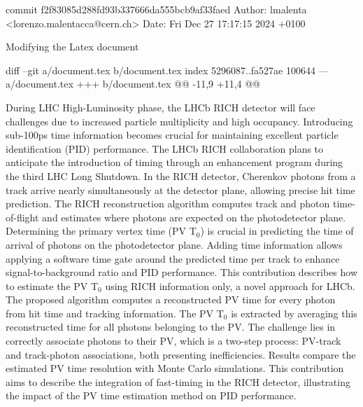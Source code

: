 commit f2f83085d288fd93b337666da555bcb9af33faed
Author: lmalenta <lorenzo.malentacca@cern.ch>
Date:   Fri Dec 27 17:17:15 2024 +0100

    Modifying the Latex document

diff --git a/document.tex b/document.tex
index 5296087..fa527ae 100644
--- a/document.tex
+++ b/document.tex
@@ -11,9 +11,4 @@
 
 During LHC High-Luminosity phase, the LHCb RICH detector will face challenges due to increased particle multiplicity and high occupancy. Introducing sub-100ps time information becomes crucial for maintaining excellent particle identification (PID) performance. The LHCb RICH collaboration plans to anticipate the introduction of timing through an enhancement program during the third LHC Long Shutdown. In the RICH detector, Cherenkov photons from a track arrive nearly simultaneously at the detector plane, allowing precise hit time prediction. The RICH reconstruction algorithm computes track and photon time-of-flight and estimates where photons are expected on the photodetector plane. Determining the primary vertex time (PV T$_0$) is crucial in predicting the time of arrival of photons on the photodetector plane. Adding time information allows applying a software time gate around the predicted time per track to enhance signal-to-background ratio and PID performance. This contribution describes how to estimate the PV T$_0$ using RICH information only, a novel approach for LHCb. The proposed algorithm computes a reconstructed PV time for every photon from hit time and tracking information. The PV T$_0$ is extracted by averaging this reconstructed time for all photons belonging to the PV. The challenge lies in correctly associate photons to their PV, which is a two-step process: PV-track and track-photon associations, both presenting inefficiencies. Results compare the estimated PV time resolution with Monte Carlo simulations. This contribution aims to describe the integration of fast-timing in the RICH detector, illustrating the impact of the PV time estimation method on PID performance.
 
